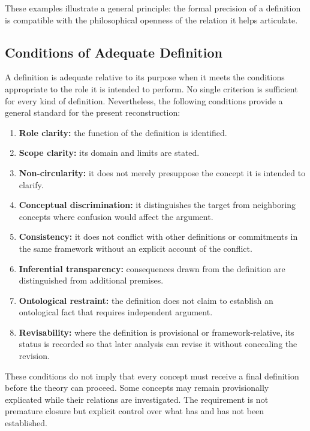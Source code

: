 These examples illustrate a general principle: the formal
precision of a definition is compatible with the philosophical
openness of the relation it helps articulate.

\subsection{Conditions of Adequate Definition}

A definition is adequate relative to its purpose when it meets
the conditions appropriate to the role it is intended to perform.
No single criterion is sufficient for every kind of definition.
Nevertheless, the following conditions provide a general
standard for the present reconstruction:

\begin{enumerate}
  \item \textbf{Role clarity:} the function of the definition
  is identified.
  \item \textbf{Scope clarity:} its domain and limits are stated.
  \item \textbf{Non-circularity:} it does not merely presuppose
  the concept it is intended to clarify.
  \item \textbf{Conceptual discrimination:} it distinguishes
  the target from neighboring concepts where confusion would
  affect the argument.
  \item \textbf{Consistency:} it does not conflict with other
  definitions or commitments in the same framework without
  an explicit account of the conflict.
  \item \textbf{Inferential transparency:} consequences drawn
  from the definition are distinguished from additional
  premises.
  \item \textbf{Ontological restraint:} the definition does
  not claim to establish an ontological fact that requires
  independent argument.
  \item \textbf{Revisability:} where the definition is
  provisional or framework-relative, its status is recorded
  so that later analysis can revise it without concealing
  the revision.
\end{enumerate}

These conditions do not imply that every concept must receive
a final definition before the theory can proceed. Some concepts
may remain provisionally explicated while their relations are
investigated. The requirement is not premature closure but
explicit control over what has and has not been established.

